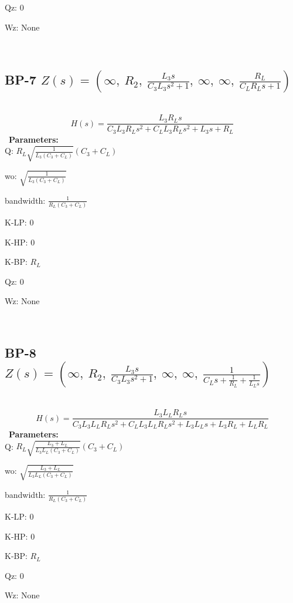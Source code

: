 \documentclass{article}
\begin{document}
Qz: $0$\ 

Wz: $\text{None}$\ 

\ 

\subsection{BP-7 $Z(s) = \left( \infty, \  R_{2}, \  \frac{L_{3} s}{C_{3} L_{3} s^{2} + 1}, \  \infty, \  \infty, \  \frac{R_{L}}{C_{L} R_{L} s + 1}\right)$ } \ 
\textbf{\[H(s) = \frac{L_{3} R_{L} s}{C_{3} L_{3} R_{L} s^{2} + C_{L} L_{3} R_{L} s^{2} + L_{3} s + R_{L}}\] } \ 
\textbf{Parameters:}\\ 

Q: $R_{L} \sqrt{\frac{1}{L_{3} \left(C_{3} + C_{L}\right)}} \left(C_{3} + C_{L}\right)$\ 

wo: $\sqrt{\frac{1}{L_{3} \left(C_{3} + C_{L}\right)}}$\ 

bandwidth: $\frac{1}{R_{L} \left(C_{3} + C_{L}\right)}$\ 

K-LP: $0$\ 

K-HP: $0$\ 

K-BP: $R_{L}$\ 

Qz: $0$\ 

Wz: $\text{None}$\ 

\ 

\subsection{BP-8 $Z(s) = \left( \infty, \  R_{2}, \  \frac{L_{3} s}{C_{3} L_{3} s^{2} + 1}, \  \infty, \  \infty, \  \frac{1}{C_{L} s + \frac{1}{R_{L}} + \frac{1}{L_{L} s}}\right)$ } \ 
\textbf{\[H(s) = \frac{L_{3} L_{L} R_{L} s}{C_{3} L_{3} L_{L} R_{L} s^{2} + C_{L} L_{3} L_{L} R_{L} s^{2} + L_{3} L_{L} s + L_{3} R_{L} + L_{L} R_{L}}\] } \ 
\textbf{Parameters:}\\ 

Q: $R_{L} \sqrt{\frac{L_{3} + L_{L}}{L_{3} L_{L} \left(C_{3} + C_{L}\right)}} \left(C_{3} + C_{L}\right)$\ 

wo: $\sqrt{\frac{L_{3} + L_{L}}{L_{3} L_{L} \left(C_{3} + C_{L}\right)}}$\ 

bandwidth: $\frac{1}{R_{L} \left(C_{3} + C_{L}\right)}$\ 

K-LP: $0$\ 

K-HP: $0$\ 

K-BP: $R_{L}$\ 

Qz: $0$\ 

Wz: $\text{None}$\ 

\ 
\end{document}

